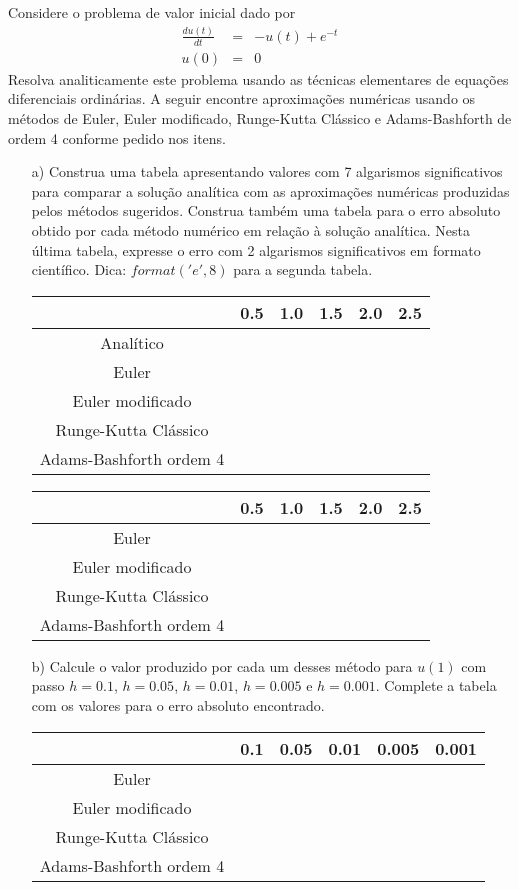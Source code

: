 \begin{Exercise} Considere o problema de valor inicial dado por
\begin{eqnarray*}
\frac{d u(t)}{dt} &=& -u(t) + e^{-t} \\
u(0)&=&0
\end{eqnarray*}
Resolva analiticamente este problema usando as técnicas elementares de equações diferenciais ordinárias. A seguir encontre aproximações numéricas usando os métodos de Euler, Euler modificado, Runge-Kutta Clássico e Adams-Bashforth de ordem 4 conforme pedido nos itens.
\begin{itemize}
\item[a)]  Construa uma tabela apresentando valores com 7 algarismos significativos para comparar a solução analítica com as aproximações numéricas produzidas pelos métodos sugeridos. Construa também uma tabela para o erro absoluto obtido por cada método numérico em relação à solução analítica. Nesta última tabela, expresse o erro com 2 algarismos significativos em formato científico. Dica: $format('e',8)$ para a segunda tabela.
\begin{center}
\begin{tabular}{|c|c|c|c|c|c|}
\hline
&0.5&1.0&1.5&2.0&2.5\\
\hline
Analítico&&&&&\\
\hline
Euler&&&&&\\
\hline
Euler modificado&&&&&\\
\hline
Runge-Kutta Clássico&&&&&\\
\hline
Adams-Bashforth ordem 4&&&&&\\
\hline
\end{tabular}
\end{center}

\begin{center}
\begin{tabular}{|c|c|c|c|c|c|}
\hline
&0.5&1.0&1.5&2.0&2.5\\
\hline
Euler&&&&&\\
\hline
Euler modificado&&&&&\\
\hline
Runge-Kutta Clássico&&&&&\\
\hline
Adams-Bashforth ordem 4&&&&&\\
\hline
\end{tabular}
\end{center}

\item[b)] Calcule o valor produzido por cada um desses método para $u(1)$ com passo $h=0.1$, $h=0.05$, $h=0.01$, $h=0.005$ e $h=0.001$. Complete a tabela com os valores para o erro absoluto encontrado.
\begin{center}
\begin{tabular}{|c|c|c|c|c|c|}
\hline
&0.1&0.05&0.01&0.005&0.001\\
\hline
Euler&&&&&\\
\hline
Euler modificado&&&&&   \\
\hline
Runge-Kutta Clássico&&&&&\\
\hline
Adams-Bashforth ordem 4&&&&&\\
\hline
\end{tabular}
\end{center}


\end{itemize}
\end{Exercise}
